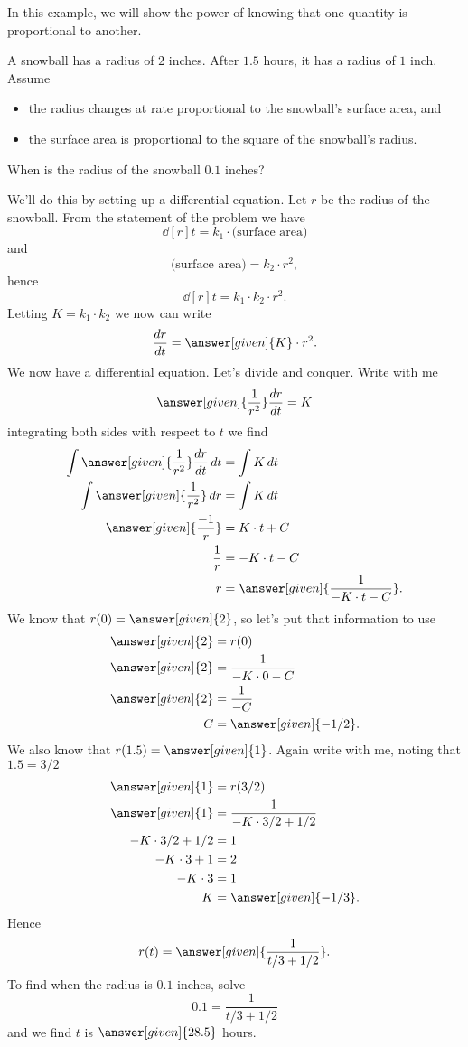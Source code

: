 \documentclass{ximera}
\begin{document}
In this example, we will show the power of knowing that one quantity
is proportional to another.

\begin{example}
  A snowball has a radius of $2$ inches. After $1.5$ hours, it has a
  radius of $1$ inch. Assume
  \begin{itemize}
  \item the radius changes at rate proportional to the snowball's
    surface area, and
  \item the surface area is proportional to the square of the
    snowball's radius.
  \end{itemize}
  When is the radius of the snowball $0.1$ inches?
  \begin{explanation}
    We'll do this by setting up a differential equation. Let $r$ be
    the radius of the snowball. From the statement of the problem we
    have
    \[
    \dd[r]{t} = k_1 \cdot \text{(surface area)}
    \]
    and
    \[
    \text{(surface area)} = k_2 \cdot r^2,
    \]
    hence
    \[
    \dd[r]{t} = k_1 \cdot k_2 \cdot r^2.
    \]
    Letting $K = k_1\cdot k_2$ we now can write
    \[
    \dd[r]{t} = \answer[given]{K}\cdot r^2.
    \]
    We now have a differential equation. Let's divide and
    conquer. Write with me
    \[
    \answer[given]{\frac{1}{r^2}}\dd[r]{t} = K
    \]
    integrating both sides with respect to $t$ we find
    \begin{align*}
      \int \answer[given]{\frac{1}{r^2}}\dd[r]{t}\d t &= \int K \d t\\
      \int \answer[given]{\frac{1}{r^2}}\d r &= \int K \d t\\
      \answer[given]{\frac{-1}{r}} &= K\cdot t+C\\
      \frac{1}{r} &= -K\cdot t- C\\
      r &=\answer[given]{\frac{1}{-K\cdot t- C}}.
    \end{align*}
    We know that $r(0) = \answer[given]{2}$, so let's put that information to use
    \begin{align*}
      \answer[given]{2} &= r(0)\\
      \answer[given]{2} &= \frac{1}{-K\cdot 0- C}\\
      \answer[given]{2} &= \frac{1}{- C}\\
      C &= \answer[given]{-1/2}.
    \end{align*}
    We also know that $r(1.5) = \answer[given]{1}$. Again write with me, noting that
    $1.5 = 3/2$
    \begin{align*}
    \answer[given]{1} &= r(3/2)\\
    \answer[given]{1} &= \frac{1}{-K\cdot 3/2 +1/2}\\
    -K\cdot 3/2 +1/2 &=1\\
    -K\cdot 3 +1 &=2\\
    -K\cdot 3 &=1\\
    K &=\answer[given]{-1/3}.
    \end{align*}
    Hence
    \[
    r(t) = \answer[given]{\frac{1}{t/3+1/2}}.
    \]
    To find when the radius is $0.1$ inches, solve
    \[
    0.1 = \frac{1}{t/3+1/2}
    \]
    and we find $t$ is $\answer[given]{28.5}$ hours.
  \end{explanation}
\end{example}
\end{document}
